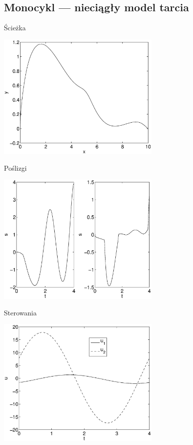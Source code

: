 \documentclass{beamer}
\begin{document}
\subsection{Monocykl --- nieciągły model tarcia}
\begin{frame}{Ścieżka}
\begin{center}
\includegraphics[width=0.6\textwidth]{img/unicycle_path.eps}
\end{center}
\end{frame}
\begin{frame}{Poślizgi}
\begin{center}
\includegraphics[width=0.6\textwidth]{img/unicycle_slips.eps}
\end{center}
\end{frame}
\begin{frame}{Sterowania}
\begin{center}
\includegraphics[width=0.6\textwidth]{img/unicycle_u.eps}
\end{center}
\end{frame}
\end{document}
